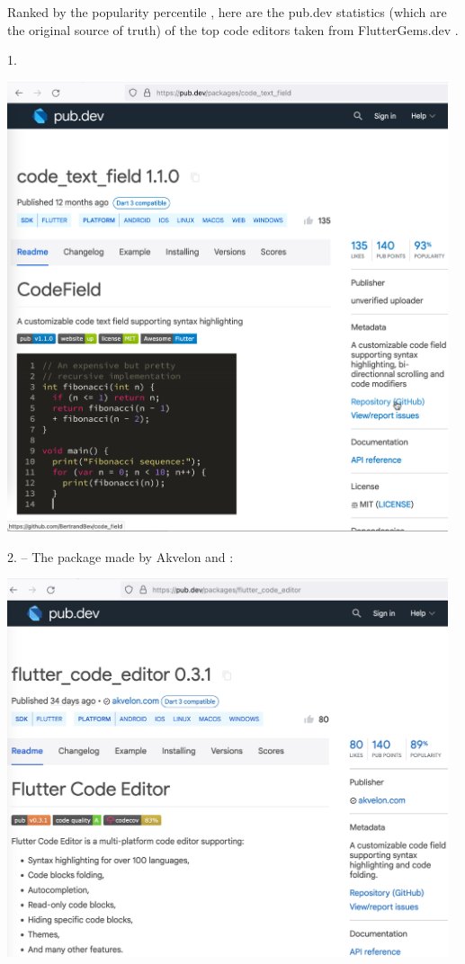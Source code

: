 
Ranked by the popularity percentile ,
here are the pub.dev statistics (which are the original source of truth)
of the top code editors taken from FlutterGems.dev .

1.

\begin{center}
    \includegraphics[width=35em]{code_text_field}
\end{center}
\pagebreak

2. -- The package made by Akvelon and \mrl:

\begin{center}
    \includegraphics[width=35em]{flutter_code_editor}
\end{center}
\pagebreak


